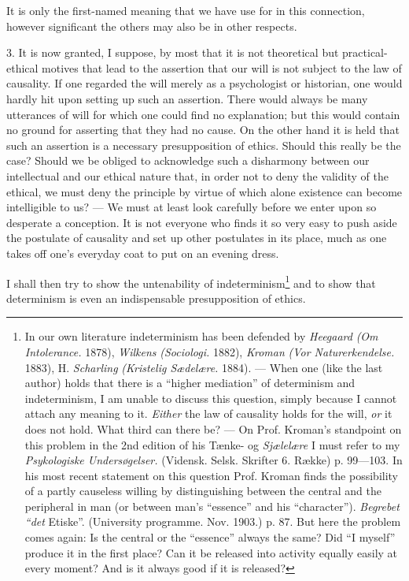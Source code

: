 \documentclass[12pt,a4paper,openany]{book}
\newcommand{\opage}[1]{\marginnote{\footnotesize\textit{[#1]}}}
\begin{document}
It is only the first-named meaning that we have use for in this connection, however significant the
others may also be in other respects.

3. It is now granted, I suppose, by most that it is not theoretical but practical-ethical motives that
lead to the assertion that our will is not subject to the law of causality. If one regarded the will
merely as a psychologist or historian, one would hardly hit upon setting up such an assertion. There
would always be many utterances of will for which one could find no explanation; but this would contain
no ground for asserting that they had no cause. On the other hand it is held that such an assertion is a
necessary presupposition of ethics. Should this really be the case? Should we be obliged to acknowledge
such a disharmony between our intellectual and our ethical nature that, in order not to deny the validity
of the ethical, we must deny the principle by virtue of which alone existence can become intelligible to
us? --- We must at least look carefully before we enter upon so desperate a conception. It is not
everyone who finds it so very easy to push aside the postulate of causality and set up other
\opage{112}postulates in its place, much as one takes off one's everyday coat to put on an evening dress.

I shall then try to show the untenability of indeterminism\footnote[1]{In our own literature
indeterminism has been defended by \emph{Heegaard} \textit{(Om Intolerance.} 1878), \emph{Wilkens}
\textit{(Sociologi.} 1882), \emph{Kroman} \textit{(Vor Naturerkendelse.} 1883), H. \emph{Scharling}
\textit{(Kristelig Sædelære.} 1884). --- When one (like the last author) holds that there is a ``higher
mediation'' of determinism and indeterminism, I am unable to discuss this question, simply because I
cannot attach any meaning to it. \textit{Either} the law of causality holds for the will, \textit{or} it
does not hold. What third can there be? --- On Prof. Kroman's standpoint on this problem in the 2nd
edition of his Tænke- og \textit{Sjælelære} I must refer to my \textit{Psykologiske Undersøgelser.}
(Vidensk. Selsk. Skrifter 6. Række) p. 99---103. In his most recent statement on this question Prof.
Kroman finds the possibility of a partly causeless willing by distinguishing between the central and the
peripheral in man (or between man's ``essence'' and his ``character''). \textit{Begrebet ``det}
Etiske''. (University programme. Nov. 1903.) p. 87. But here the problem comes again: Is the central or
the ``essence'' always the same? Did ``I myself'' produce it in the first place? Can it be released into
activity equally easily at every moment? And is it always good if it is released?} and to show that
determinism is even an indispensable presupposition of ethics.
\end{document}
